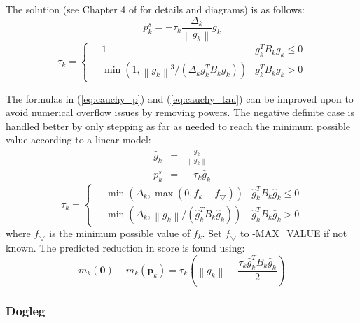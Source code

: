 \documentclass[peerreview,compsoc,onecolumn]{IEEEtran}
\newcommand{\norm}[1]{\left\lVert#1\right\rVert}
\begin{document}
The solution (see Chapter 4 of \cite{numopt2006} for details and diagrams) is as follows:
\begin{equation}
p^s_k = -\tau_k \frac{\Delta_k}{\norm{g_k}}g_k
\label{eq:cauchy_p}
\end{equation}
\begin{equation}
\tau_k = 
	\begin{cases}
		\quad 1 & g_k^T B_k g_k \le 0 \\
		\quad \min\left(1,\norm{g_k}^3/(\Delta_k g_k^T B_k g_k)\right) & g_k^T B_k g_k > 0
	\end{cases}
	\label{eq:cauchy_tau}
\end{equation}

The formulas in (\ref{eq:cauchy_p}) and (\ref{eq:cauchy_tau}) can be improved upon to avoid numerical overflow issues by removing powers. The negative definite case is handled better by only stepping as far as needed to reach the minimum possible value according to a linear model:
\begin{eqnarray}
\hat{g}_k &=& \frac{g_k}{\norm{g_k}} \\
p^s_k &=& -\tau_k \hat{g}_k
\end{eqnarray}
\begin{equation}
\tau_k = \begin{cases}
		\quad \min\left(\Delta_k, \max(0,f_k-f_{\bigtriangledown}) \right) & \hat{g}_k^T B_k \hat{g}_k\le 0 \\
		\quad \min\left(\Delta_k,\norm{g_k}/(\hat{g}_k^T B_k \hat{g}_k)\right) & \hat{g}_k^T B_k \bar{g}_k > 0
	\end{cases}
\end{equation}
where $f_{\bigtriangledown}$ is the minimum possible value of $f_k$. Set $f_{\bigtriangledown}$ to -MAX\_VALUE if not known. The predicted reduction in score is found using:
\begin{equation}
m_k(\bm{0})-m_k(\bm{p}_k) = \tau_k\left(\norm{g_k} - \frac{\tau_k \hat{g}_k^T B_k \hat{g}_k}{2} \right)
\end{equation}


\subsubsection{Dogleg}
\label{section:dogleg}  
\end{document}

